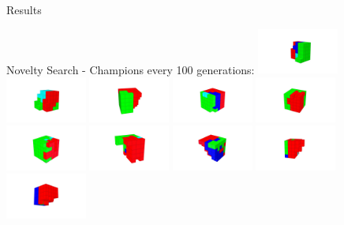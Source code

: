 \documentclass{beamer}
\begin{document}
\begin{frame}[allowframebreaks]{Results}
\newpage
\begin{minipage}{\textwidth}
\begin{block}{Novelty Search - Champions every 100 generations:}
\includegraphics[width=0.2\textwidth]{../Figures/Robots/n_3_g_100.jpg}
\includegraphics[width=0.2\textwidth]{../Figures/Robots/n_3_g_200.jpg}
\includegraphics[width=0.2\textwidth]{../Figures/Robots/n_3_g_300.jpg}
\includegraphics[width=0.2\textwidth]{../Figures/Robots/n_3_g_400.jpg}
\includegraphics[width=0.2\textwidth]{../Figures/Robots/n_3_g_500.jpg}\\
\includegraphics[width=0.2\textwidth]{../Figures/Robots/n_3_g_600.jpg}
\includegraphics[width=0.2\textwidth]{../Figures/Robots/n_3_g_700.jpg}
\includegraphics[width=0.2\textwidth]{../Figures/Robots/n_3_g_800.jpg}
\includegraphics[width=0.2\textwidth]{../Figures/Robots/n_3_g_900.jpg}
\includegraphics[width=0.2\textwidth]{../Figures/Robots/n_3_g_1000.jpg}
\end{block}


\end{minipage}
\end{frame}
\end{document}
